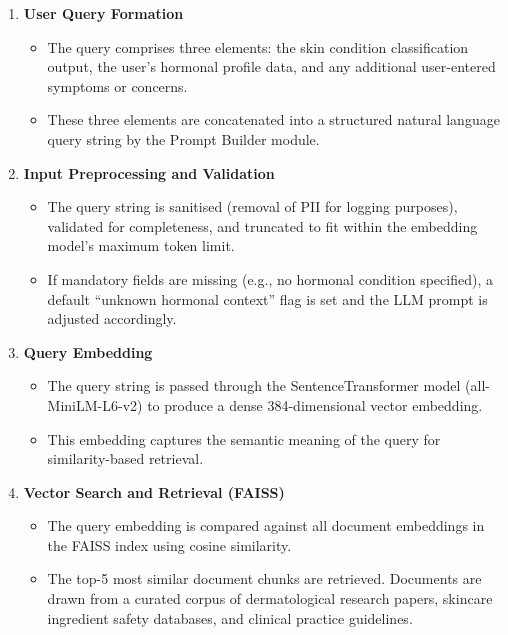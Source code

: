 \begin{enumerate}
    \item \textbf{User Query Formation}
    \begin{itemize}
        \item The query comprises three elements: the skin condition classification output, the user's hormonal profile data, and any additional user-entered symptoms or concerns.
        \item These three elements are concatenated into a structured natural language query string by the Prompt Builder module.
    \end{itemize}
    \vspace{0.3cm}

    \item \textbf{Input Preprocessing and Validation}
    \begin{itemize}
        \item The query string is sanitised (removal of PII for logging purposes), validated for completeness, and truncated to fit within the embedding model's maximum token limit.
        \item If mandatory fields are missing (e.g., no hormonal condition specified), a default ``unknown hormonal context'' flag is set and the LLM prompt is adjusted accordingly.
    \end{itemize}
    \vspace{0.3cm}

    \item \textbf{Query Embedding}
    \begin{itemize}
        \item The query string is passed through the SentenceTransformer model (all-MiniLM-L6-v2) to produce a dense 384-dimensional vector embedding.
        \item This embedding captures the semantic meaning of the query for similarity-based retrieval.
    \end{itemize}
    \vspace{0.3cm}

    \item \textbf{Vector Search and Retrieval (FAISS)}
    \begin{itemize}
        \item The query embedding is compared against all document embeddings in the FAISS index using cosine similarity.
        \item The top-5 most similar document chunks are retrieved. Documents are drawn from a curated corpus of dermatological research papers, skincare ingredient safety databases, and clinical practice guidelines.
    \end{itemize}
    \vspace{0.3cm}


\end{enumerate}
